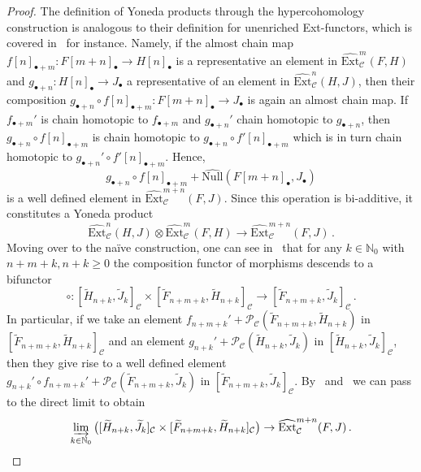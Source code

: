 \documentclass[12pt, a4paper]{article}
\numberwithin{equation}{section}
\theoremstyle{empty}
\theoremstyle{nonumberplain}
\newtheorem{proof}{Proof}
\begin{document}
\begin{proof}
The definition of Yoneda products through the hypercohomology construction is analogous to their definition for unenriched Ext-functors, which is covered in~\cite[p.~166]{gel03} for instance. Namely, if the almost chain map $f[n]_{\bullet+m}: F[m+n]_{\bullet} \rightarrow H[n]_{\bullet}$ is a representative an element in $\widehat{\mathrm{Ext}}_{\mathcal{C}}^m(F, H)$ and $g_{\bullet+n}: H[n]_{\bullet} \rightarrow J_{\bullet}$ a representative of an element in $\widehat{\mathrm{Ext}}_{\mathcal{C}}^n(H, J)$, then their composition $g_{\bullet+n} \circ f[n]_{\bullet+m}: F[m+n]_{\bullet} \rightarrow J_{\bullet}$ is again an almost chain map. If $f_{\bullet+m}'$ is chain homotopic to $f_{\bullet+m}$ and $g_{\bullet+n}'$ chain homotopic to $g_{\bullet+n}$, then $g_{\bullet+n} \circ f[n]_{\bullet+m}$ is chain homotopic to $g_{\bullet+n} \circ f'[n]_{\bullet+m}$ which is in turn chain homotopic to $g_{\bullet+n}' \circ f'[n]_{\bullet+m}$. Hence,
\[ g_{\bullet+n} \circ f[n]_{\bullet+m}+\widehat{\mathrm{Null}}(F[m+n]_{\bullet}, J_{\bullet}) \]
is a well defined element in $\widehat{\mathrm{Ext}}_{\mathcal{C}}^{m+n}(F, J)$. Since this operation is bi-additive, it constitutes a Yoneda product
\[ \widehat{\mathrm{Ext}}_{\mathcal{C}}^n(H, J) \otimes \widehat{\mathrm{Ext}}_{\mathcal{C}}^m(F, H) \rightarrow \widehat{\mathrm{Ext}}_{\mathcal{C}}^{m+n}(F, J) \, . \]
Moving over to the naïve construction, one can see in~\cite[Proposition~5.1]{ghe24} that for any $k \in \mathbb{N}_0$ with $n+m+k, n+k \geq 0$ the composition functor of morphisms descends to a bifunctor
\[ \circ: [\widetilde{H}_{n+k}, \widetilde{J}_k]_{\mathcal{C}} \times [\widetilde{F}_{n+m+k}, \widetilde{H}_{n+k}]_{\mathcal{C}} \rightarrow [\widetilde{F}_{n+m+k}, \widetilde{J}_k]_{\mathcal{C}} \, . \]
In particular, if we take an element $f_{n+m+k}' + \mathcal{P}_{\mathcal{C}}(\widetilde{F}_{n+m+k}, \widetilde{H}_{n+k})$ in $[\widetilde{F}_{n+m+k}, \widetilde{H}_{n+k}]_{\mathcal{C}}$ and an element $g_{n+k}'+\mathcal{P}_{\mathcal{C}}(\widetilde{H}_{n+k}, \widetilde{J}_k)$ in $[\widetilde{H}_{n+k}, \widetilde{J}_k]_{\mathcal{C}}$, then they give rise to a well defined element $g_{n+k}' \circ f_{n+m+k}'+ \mathcal{P}_{\mathcal{C}}(\widetilde{F}_{n+m+k}, \widetilde{J}_k)$ in $[\widetilde{F}_{n+m+k}, \widetilde{J}_k]_{\mathcal{C}}$. By~\cite[Proposition~5.2]{ghe24} and~\cite[Definition~5.3]{ghe24} we can pass to the direct limit to obtain
\[ \varinjlim_{k \in \mathbb{N}_0} \big([\widetilde{H}_{n+k}, \widetilde{J}_k]_{\mathcal{C}} \times [\widetilde{F}_{n+m+k}, \widetilde{H}_{n+k}]_{\mathcal{C}}\big) \rightarrow \widehat{\mathrm{Ext}}_{\mathcal{C}}^{m+n}(F, J) \, . \]

\end{proof}
\end{document}
